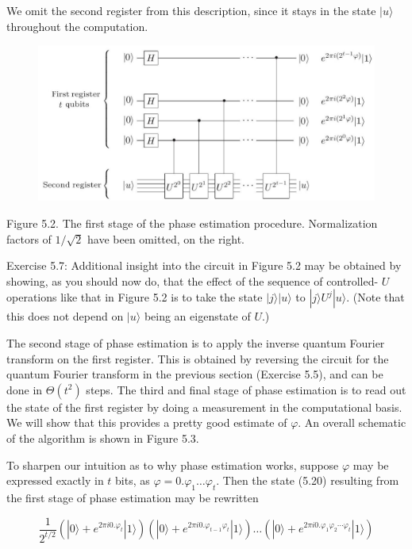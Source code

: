 We omit the second register from this description, since it stays in the state $|u\rangle$ throughout the computation.

\begin{figure}
\centering
\includegraphics[width=0.75\linewidth]{Images/2024_05_17_6977ce60de6fd27aef98g-256}
\end{figure}

Figure 5.2. The first stage of the phase estimation procedure. Normalization factors of $1 / \sqrt{2}$ have been omitted, on the right.

Exercise 5.7: Additional insight into the circuit in Figure 5.2 may be obtained by showing, as you should now do, that the effect of the sequence of controlled- $U$ operations like that in Figure 5.2 is to take the state $|j\rangle|u\rangle$ to $|j\rangle U^{j}|u\rangle$. (Note that this does not depend on $|u\rangle$ being an eigenstate of $U$.)

The second stage of phase estimation is to apply the inverse quantum Fourier transform on the first register. This is obtained by reversing the circuit for the quantum Fourier transform in the previous section (Exercise 5.5), and can be done in $\Theta\left(t^{2}\right)$ steps. The third and final stage of phase estimation is to read out the state of the first register by doing a measurement in the computational basis. We will show that this provides a pretty good estimate of $\varphi$. An overall schematic of the algorithm is shown in Figure 5.3.

To sharpen our intuition as to why phase estimation works, suppose $\varphi$ may be expressed exactly in $t$ bits, as $\varphi=0 . \varphi_{1} \ldots \varphi_{t}$. Then the state (5.20) resulting from the first stage of phase estimation may be rewritten

\begin{equation}
    \frac{1}{2^{t / 2}}\left(|0\rangle+e^{2 \pi i 0 . \varphi_{t}}|1\rangle\right)\left(|0\rangle+e^{2 \pi i 0 . \varphi_{t-1} \varphi_{t}}|1\rangle\right) \ldots\left(|0\rangle+e^{2 \pi i 0 . \varphi_{1} \varphi_{2} \cdots \varphi_{t}}|1\rangle\right) \tag{5.21}
\end{equation}

